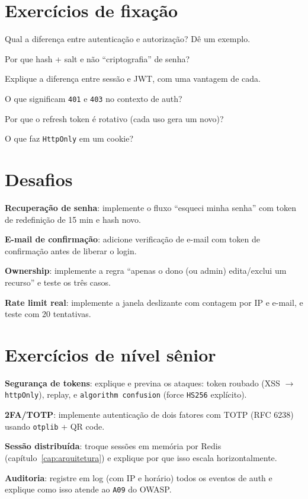 \section{Exercícios de fixação}

\begin{exercicios}
  \item Qual a diferença entre autenticação e autorização? Dê um exemplo.
  \item Por que hash + salt e não ``criptografia'' de senha?
  \item Explique a diferença entre sessão e JWT, com uma vantagem de cada.
  \item O que significam \texttt{401} e \texttt{403} no contexto de auth?
  \item Por que o refresh token é rotativo (cada uso gera um novo)?
  \item O que faz \texttt{HttpOnly} em um cookie?
\end{exercicios}

\section{Desafios}

\begin{desafios}
  \item \textbf{Recuperação de senha}: implemente o fluxo ``esqueci minha senha'' com token de redefinição de 15 min e hash novo.
  \item \textbf{E-mail de confirmação}: adicione verificação de e-mail com token de confirmação antes de liberar o login.
  \item \textbf{Ownership}: implemente a regra ``apenas o dono (ou admin) edita/exclui um recurso'' e teste os três casos.
  \item \textbf{Rate limit real}: implemente a janela deslizante com contagem por IP e e-mail, e teste com 20 tentativas.
\end{desafios}

\section{Exercícios de nível sênior}

\begin{seniores}
  \item \textbf{Segurança de tokens}: explique e previna os ataques: token roubado (XSS $\rightarrow$ \texttt{httpOnly}), replay, e \texttt{algorithm confusion} (force \texttt{HS256} explícito).
  \item \textbf{2FA/TOTP}: implemente autenticação de dois fatores com TOTP (RFC 6238) usando \texttt{otplib} + QR code.
  \item \textbf{Sessão distribuída}: troque sessões em memória por Redis (capítulo~\ref{cap:arquitetura}) e explique por que isso escala horizontalmente.
  \item \textbf{Auditoria}: registre em log (com IP e horário) todos os eventos de auth e explique como isso atende ao \texttt{A09} do OWASP.
\end{seniores}

